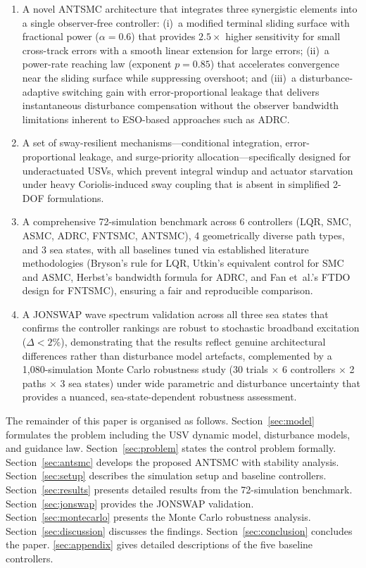 \documentclass[review]{cas-dc}
\begin{document}
\begin{enumerate}
    \item A novel ANTSMC architecture that integrates three synergistic elements into a single observer-free controller: (i)~a modified terminal sliding surface with fractional power ($\alpha = 0.6$) that provides $2.5\times$ higher sensitivity for small cross-track errors with a smooth linear extension for large errors; (ii)~a power-rate reaching law (exponent $p = 0.85$) that accelerates convergence near the sliding surface while suppressing overshoot; and (iii)~a disturbance-adaptive switching gain with error-proportional leakage that delivers instantaneous disturbance compensation without the observer bandwidth limitations inherent to ESO-based approaches such as ADRC.

    \item A set of sway-resilient mechanisms---conditional integration, error-proportional leakage, and surge-priority allocation---specifically designed for underactuated USVs, which prevent integral windup and actuator starvation under heavy Coriolis-induced sway coupling that is absent in simplified 2-DOF formulations.

    \item A comprehensive 72-simulation benchmark across 6 controllers (LQR, SMC, ASMC, ADRC, FNTSMC, ANTSMC), 4 geometrically diverse path types, and 3 sea states, with all baselines tuned via established literature methodologies (Bryson's rule for LQR, Utkin's equivalent control for SMC and ASMC, Herbst's bandwidth formula for ADRC, and Fan et~al.'s FTDO design for FNTSMC), ensuring a fair and reproducible comparison.

    \item A JONSWAP wave spectrum validation across all three sea states that confirms the controller rankings are robust to stochastic broadband excitation ($\Delta < 2\%$), demonstrating that the results reflect genuine architectural differences rather than disturbance model artefacts, complemented by a 1{,}080-simulation Monte Carlo robustness study (30 trials $\times$ 6 controllers $\times$ 2 paths $\times$ 3 sea states) under wide parametric and disturbance uncertainty that provides a nuanced, sea-state-dependent robustness assessment.
\end{enumerate}

The remainder of this paper is organised as follows. Section~\ref{sec:model} formulates the problem including the USV dynamic model, disturbance models, and guidance law. Section~\ref{sec:problem} states the control problem formally. Section~\ref{sec:antsmc} develops the proposed ANTSMC with stability analysis. Section~\ref{sec:setup} describes the simulation setup and baseline controllers. Section~\ref{sec:results} presents detailed results from the 72-simulation benchmark. Section~\ref{sec:jonswap} provides the JONSWAP validation. Section~\ref{sec:montecarlo} presents the Monte Carlo robustness analysis. Section~\ref{sec:discussion} discusses the findings. Section~\ref{sec:conclusion} concludes the paper. \ref{sec:appendix} gives detailed descriptions of the five baseline controllers.
\end{document}
